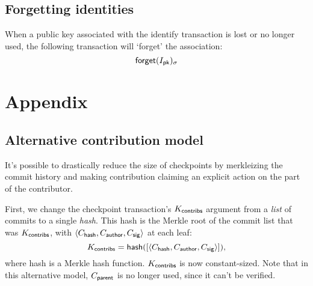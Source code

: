 
\subsection{Forgetting identities}
When a public key associated with the \textsf{identify} transaction is lost or no
longer used, the following transaction will `forget' the association:
\[
    \operatorname{\mathsf{forget}}\lparen I_{\mathsf{pk}}\rparen_\sigma
\]

\appendix
\section*{Appendix}

\subsection*{Alternative contribution model}
It's possible to drastically reduce the size of checkpoints by merkleizing the commit
history and making contribution claiming an explicit action on the part of
the contributor.

First, we change the checkpoint transaction's $K_{\mathsf{contribs}}$ argument from a \emph{list}
of commits to a single \emph{hash}. This hash is the Merkle root of the commit list
that was $K_{\mathsf{contribs}}$, with $\langle C_{\mathsf{hash}}, C_{\mathsf{author}}, C_{\mathsf{sig}}\rangle$ at each leaf:
\[
    K_{\mathsf{contribs}} = \operatorname{\mathsf{hash}}(
        [\langle C_{\mathsf{hash}}, C_{\mathsf{author}}, C_{\mathsf{sig}}\rangle]
    ),
\]
where \textsf{hash} is a Merkle hash function. $K_{\mathsf{contribs}}$ is
now constant-sized. Note that in this alternative model, $C_{\mathsf{parent}}$ is
no longer used, since it can't be verified.

